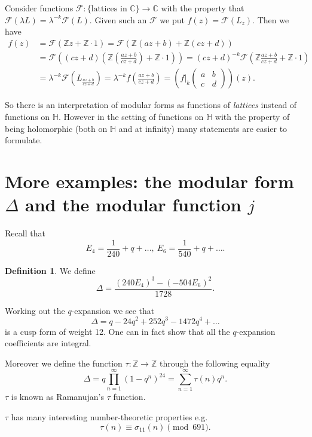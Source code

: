\documentclass{article}
\theoremstyle{definition}
\newtheorem*{defn}{Definition}
\begin{document}
Consider functions $\mathcal{F}\colon\{\text{lattices in }\mathbb{C}\}\to\mathbb{C}$ with the property that $\mathcal{F}(\lambda L) = \lambda^{-k}\mathcal{F}(L)$.
Given such an $\mathcal{F}$ we put $f(z) = \mathcal{F}(L_z)$.
Then we have
\begin{align*}
f(z) &= \mathcal{F}(\mathbb{Z}z+\mathbb{Z}\cdot 1) = \mathcal{F}(\mathbb{Z}(az+b) +\mathbb{Z}(cz+d)) \\ 
&= \mathcal{F}\left((cz+d)\left(\mathbb{Z}\left(\frac{az+b}{cz+d}\right) + \mathbb{Z}\cdot 1\right)\right)=(cz+d)^{-k}\mathcal{F}\left(\mathbb{Z}\frac{az+b}{cz+d} + \mathbb{Z}\cdot 1\right)\\
&= \lambda^{-k}\mathcal{F}\left(L_{\frac{az+b}{cz+d}}\right) = \lambda^{-k}f\left(\frac{az+b}{cz+d}\right) = \left(f|_k\begin{pmatrix}a&b\\c&d\end{pmatrix}\right)(z).\end{align*}

So there is an interpretation of modular forms as functions of \emph{lattices} instead of functions on $\mathbb{H}$.
However in the setting of functions on $\mathbb{H}$ with the property of being holomorphic (both on $\mathbb{H}$ and at infinity) many statements are easier to formulate.

\section{More examples: the modular form $\Delta$ and the modular function $j$}
Recall that
\[E_4 = \frac{1}{240} + q + \ldots,\ E_6 = \frac{1}{540}+ q+ \ldots.\]

\begin{defn}
We define
\[\Delta = \frac{(240E_4)^3 - (-504E_6)^2}{1728}.\]
\end{defn}

Working out the $q$-expansion we see that
\[\Delta = q - 24 q^2 + 252q^3 - 1472q^4+ \ldots\]
is a cusp form of weight 12.
One can in fact show that all the $q$-expansion coefficients are integral.

Moreover we define the function $\tau\colon\mathbb{Z}\to\mathbb{Z}$ through the following equality
\[\Delta = q \prod_{n=1}^\infty(1-q^n)^{24} = \sum_{n=1}^\infty \tau(n)q^n.\]
$\tau$ is known as Ramanujan's $\tau$ function.

$\tau$ has many interesting number-theoretic properties e.g.
\[\tau(n) \equiv \sigma_{11}(n)\pmod{691}.\]
\end{document}
